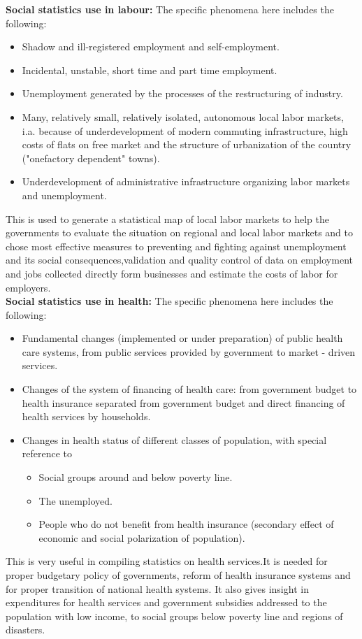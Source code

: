 \documentclass[11pt]{article}
\begin{document}
\noindent\textbf{Social statistics use in labour:} The specific phenomena here includes the following:
\begin{itemize}
\item Shadow and ill-registered employment and self-employment.
\item Incidental, unstable, short time and part time employment.
\item Unemployment generated by the processes of the restructuring of industry.
\item Many, relatively small, relatively isolated, autonomous local labor markets, i.a. because of underdevelopment of modern commuting infrastructure, high costs of flats on free market and the structure of urbanization of the country ("onefactory dependent" towns).
\item Underdevelopment of administrative infrastructure organizing labor markets and unemployment.
\end{itemize}  
\noindent This is used to generate a statistical map of local labor markets to help the governments to evaluate the situation on regional and local labor markets and to chose most effective measures to preventing and fighting against unemployment and its social consequences,validation and quality control of data on employment and jobs collected directly form businesses  and estimate the costs of labor for employers. \\

\noindent\textbf{Social statistics use in health:} The specific phenomena here includes the following:
\begin{itemize}
\item Fundamental changes (implemented or under preparation) of public health care systems, from public services provided by government to market - driven services.
\item Changes of the system of financing of health care: from government budget to health insurance separated from government budget and direct financing of health services by households.
\item Changes in health status of different classes of population, with special reference to
  \begin{itemize}
  \item Social groups around and below poverty line.
  \item The unemployed.
  \item People who do not benefit from health insurance (secondary effect of economic and social polarization
    of population).
  \end{itemize}
\end{itemize}
\noindent This is very useful in  compiling statistics on health services.It is needed for proper budgetary policy of governments, reform of health insurance systems and for proper transition of national health systems. It also gives insight in expenditures for health services and government subsidies addressed to the population
with low income, to social groups below poverty line and regions of disasters. \\
\end{document}

